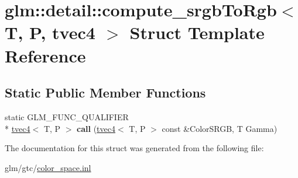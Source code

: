\hypertarget{structglm_1_1detail_1_1compute__srgbToRgb_3_01T_00_01P_00_01tvec4_01_4}{\section{glm\-:\-:detail\-:\-:compute\-\_\-srgb\-To\-Rgb$<$ T, P, tvec4 $>$ Struct Template Reference}
\label{structglm_1_1detail_1_1compute__srgbToRgb_3_01T_00_01P_00_01tvec4_01_4}
}
\subsection*{Static Public Member Functions}
\begin{DoxyCompactItemize}
\item 
\hypertarget{structglm_1_1detail_1_1compute__srgbToRgb_3_01T_00_01P_00_01tvec4_01_4_a09238f9fb7bdd410512b3daf66ecabbc}{static G\-L\-M\-\_\-\-F\-U\-N\-C\-\_\-\-Q\-U\-A\-L\-I\-F\-I\-E\-R \\*
\hyperlink{structglm_1_1tvec4}{tvec4}$<$ T, P $>$ {\bfseries call} (\hyperlink{structglm_1_1tvec4}{tvec4}$<$ T, P $>$ const \&Color\-S\-R\-G\-B, T Gamma)}\label{structglm_1_1detail_1_1compute__srgbToRgb_3_01T_00_01P_00_01tvec4_01_4_a09238f9fb7bdd410512b3daf66ecabbc}

\end{DoxyCompactItemize}


The documentation for this struct was generated from the following file\-:\begin{DoxyCompactItemize}
\item 
glm/gtc/\hyperlink{gtc_2color__space_8inl}{color\-\_\-space.\-inl}\end{DoxyCompactItemize}
